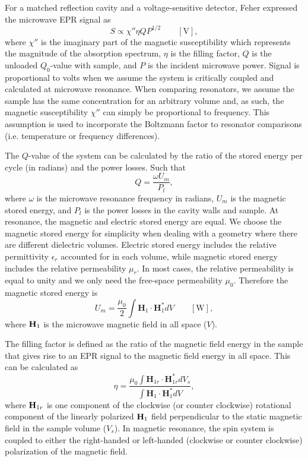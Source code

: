 For a matched reflection cavity and a voltage-sensitive detector, Feher expressed the microwave EPR signal as
\begin{equation}
    S \propto \chi'' \eta Q P^{1/2} \qquad [\text{V}],\label{ch2-fehereq}
\end{equation}
where $\chi''$ is the imaginary part of the magnetic susceptibility which represents the magnitude of the absorption spectrum, $\eta$ is the filling factor, $Q$ is the unloaded $Q_0$-value with sample, and $P$ is the incident microwave power.  \cite{FeherSignal} Signal is proportional to volts when we assume the system is critically coupled and calculated at microwave resonance. When comparing resonators, we assume the sample has the same concentration for an arbitrary volume and, as such, the magnetic susceptibility $\chi''$ can simply be proportional to frequency. This assumption is used to incorporate the Boltzmann factor to resonator comparisons (i.e. temperature or frequency differences).

The $Q$-value of the system can be calculated by the ratio of the stored energy per cycle (in radians) and the power losses. Such that
\begin{equation}
    Q = \frac{\omega U_m}{P_l},\label{ch2-Qval}
\end{equation}
where $\omega$ is the microwave resonance frequency in radians, $U_m$ is the magnetic stored energy, and $P_l$ is the power losses in the cavity walls and sample. At resonance, the magnetic and electric stored energy are equal. \cite{ramo1984fields} We choose the magnetic stored energy for simplicity when dealing with a geometry where there are different dielectric volumes. Electric stored energy includes the relative permittivity $\epsilon_r$ accounted for in each volume, while magnetic stored energy includes the relative permeability $\mu_r$. In most cases, the relative permeability is equal to unity and we only need the free-space permeability $\mu_0$. Therefore the magnetic stored energy is
\begin{equation}
    U_m = \frac{\mu_0}{2} \int \mathbf{H}_1\cdot\mathbf{H}_1^* dV \qquad [\text{W}],
\end{equation}
where ${\textbf H}_1$ is the microwave magnetic field in all space ($V$).

The filling factor is defined as the ratio of the magnetic field energy in the sample that gives rise to an EPR signal to the magnetic field energy in all space. This can be calculated as
\begin{equation}
 \eta = \frac{\mu_0 \int {\mathbf H}_{1r} \cdot {\mathbf H}_{1r}^* dV_s}{\int {\mathbf H}_1 \cdot {\mathbf H}_1^* dV}, \label{eq-2:filling}
\end{equation}
where ${\textbf H}_{1r}$ is one component of the clockwise (or counter clockwise) rotational component of the linearly polarized ${\textbf H}_1$ field perpendicular to the static magnetic field in the sample volume ($V_s$). \cite{jackson1975classical} In magnetic resonance, the spin system is coupled to either the right-handed or left-handed (clockwise or counter clockwise) polarization of the magnetic field. 

